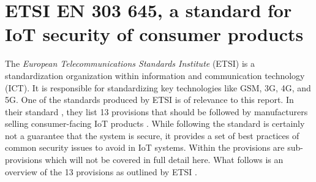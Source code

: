 \section{ETSI EN 303 645, a standard for IoT security of consumer products} \label{ch:related-work:etsi}
The \textit{European Telecommunications Standards Institute} (ETSI) is a standardization organization within information and communication technology (ICT). It is responsible for standardizing key technologies like GSM, 3G, 4G, and 5G. One of the standards produced by ETSI is of relevance to this report. In their standard , they list 13 provisions that should be followed by manufacturers selling consumer-facing IoT products \cite{etsi-iot-standard}. While following the standard is certainly not a guarantee that the system is secure, it provides a set of best practices of common security issues to avoid in IoT systems. Within the provisions are sub-provisions which will not be covered in full detail here. What follows is an overview of the 13 provisions as outlined by ETSI \cite{etsi-iot-standard}.
